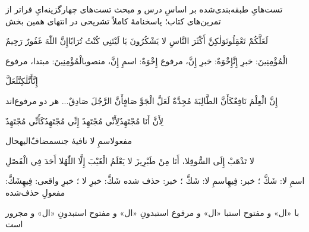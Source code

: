   {تست‌هایِ طبقه‌بندی‌شده بر اساسِ درس و مبحث}
  {تست‌های چهارگزینه‌ایِ فراتر از تمرین‌های کتاب؛ پاسخنامهٔ کاملاً تشریحی در
   انتهای همین بخش}



{لَعَلَّكُمْ تَعْقِلُونَ}{وَلٰكِنَّ أَكْثَرَ النَّاسِ لا يَشْكُرُونَ}
{يَا لَيْتَنِي كُنْتُ تُرَابًا}{إِنَّ اللّٰهَ غَفُورٌ رَحِيمٌ}

{الْمُؤْمِنِينَ: خبرِ إِنَّ}{إِخْوَةٌ: خبرِ إِنَّ، مرفوع}
{إِخْوَةٌ: اسمِ إِنَّ، منصوب}{الْمُؤْمِنِينَ: مبتدا، مرفوع}

{إِنَّ}{أَنَّ}{لٰكِنَّ}{لَعَلَّ}

{إِنَّ الْعِلْمَ نَافِعٌ}{كَأَنَّ الطَّالِبَةَ مُجِدَّةٌ}
{لَعَلَّ الْجَوَّ صَافٍ}{أَنَّ الرَّجُلَ صَادِقٌ... هر دو مرفوع‌اند}

{لِأَنَّ أَنَا مُجْتَهِدٌ}{لِأَنِّي مُجْتَهِدٌ}
{إِنِّي مُجْتَهِدٌ}{كَأَنِّي مُجْتَهِدٌ}


{مفعول}{اسمِ لا نافیهٔ جنس}{مضافٌ‌الیه}{حال}

{لا تَذْهَبْ إِلَى السُّوقِ}{لا، أَنَا مِنْ طَبْرِيزَ}
{لا يَعْلَمُ الْغَيْبَ إِلَّا اللّٰهُ}{لا أَحَدَ فِي الْفَصْلِ}

{اسمِ لا: شَكَّ ؛ خبر: فِيهِ}{اسمِ لا: شَكَّ ؛ خبر: حذف شده}
{شَكَّ: خبرِ لا ؛ خبرِ واقعی: فِيهِ}{شَكَّ: مفعولِ حذف‌شده}

{با «ال» و مفتوح است}{با «ال» و مرفوع است}{بدونِ «ال» و مفتوح است}{بدونِ «ال» و مجرور است}

